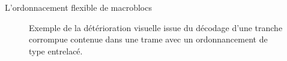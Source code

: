 \begin{section}{L'ordonnacement flexible de macroblocs}
\begin{figure}
	\caption[Détérioration visuelle issue d'un ordonnancement entrelacé]{Exemple de
la détérioration visuelle issue du décodage d'une tranche corrompue contenue
dans une trame avec un ordonnancement de type entrelacé.}
	\label{fig-ExempleEntrelace}
\end{figure}

\end{section}

